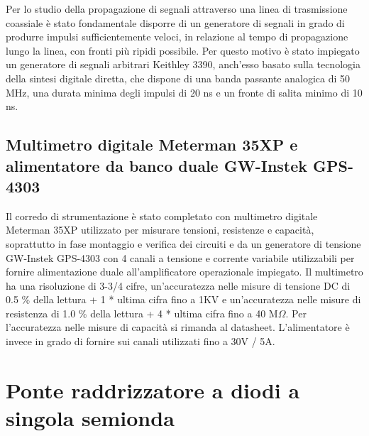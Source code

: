 \documentclass[journal]{IEEEtran}
\begin{document}
Per lo studio della propagazione di segnali attraverso una linea di trasmissione coassiale è stato fondamentale disporre di un generatore di segnali in grado di produrre impulsi sufficientemente veloci, in relazione al tempo di propagazione lungo la linea, con fronti più ripidi possibile. Per questo motivo è stato impiegato un generatore di segnali arbitrari Keithley 3390, anch'esso basato sulla tecnologia della sintesi digitale diretta, che dispone di una banda passante analogica di 50 MHz, una durata minima degli impulsi di 20 ns e un fronte di salita minimo di 10 ns. \cite{F}

\subsection{\textbf{Multimetro digitale Meterman 35XP e alimentatore da banco duale GW-Instek GPS-4303}}
Il corredo di strumentazione è stato completato con multimetro digitale Meterman 35XP utilizzato per misurare tensioni, resistenze e capacità, soprattutto in fase montaggio e verifica dei circuiti e da un generatore di tensione GW-Instek GPS-4303 con 4 canali a tensione e corrente variabile utilizzabili per fornire alimentazione duale all'amplificatore operazionale impiegato. Il multimetro ha una risoluzione di 3-3/4 cifre, un'accuratezza nelle misure di tensione DC di 0.5 \% della lettura + 1 * ultima cifra fino a 1KV e un'accuratezza nelle misure di resistenza di 1.0 \% della lettura + 4 * ultima cifra fino a 40 M$\Omega$. Per l'accuratezza nelle misure di capacità si rimanda al datasheet. L'alimentatore è invece in grado di fornire sui canali utilizzati fino a 30V / 5A. \cite{C} \cite{D}

\section{\textbf{Ponte raddrizzatore a diodi a singola semionda}} %
\end{document}
